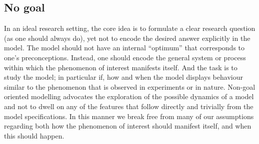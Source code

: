 \subsection{No goal}

In an ideal research setting, the core idea is to formulate a clear research question (as one should always do), yet not to encode the desired answer explicitly in the model. The model should not have an internal “optimum” that corresponds to one’s preconceptions. Instead, one should encode the general system or process within which the phenomenon of interest manifests itself. And the task is to study the model; in particular if, how and when the model displays behaviour similar to the phenomenon that is observed in experiments or in nature. Non-goal oriented modelling advocates the exploration of the possible dynamics of a model and not to dwell on any of the features that follow directly and trivially from the model specifications. In this manner we break free from many of our assumptions regarding both how the phenomenon of interest should manifest itself, and when this should happen.